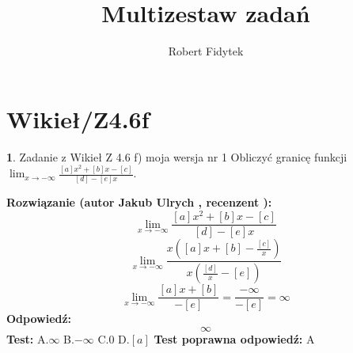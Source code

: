 \documentclass[12pt, a4paper]{article}
\title{Multizestaw zadań}
\author{Robert Fidytek}
\date{}
\theoremstyle{definition} %
\newtheorem{zad}{}
\newcommand{\kategoria}[1]{\section{#1}} %
\newcommand{\zadStart}[1]{\begin{zad}#1\newline} %
\newcommand{\zadStop}{\end{zad}}   %
\newcommand{\rozwStart}[2]{\noindent \textbf{Rozwiązanie (autor #1 , recenzent #2): }\newline} %
\newcommand{\rozwStop}{\newline}                                            %
\newcommand{\odpStart}{\noindent \textbf{Odpowiedź:}\newline}    %
\newcommand{\odpStop}{\newline}                                             %
\newcommand{\testStart}{\noindent \textbf{Test:}\newline} %
\newcommand{\testStop}{\newline} %
\newcommand{\kluczStart}{\noindent \textbf{Test poprawna odpowiedź:}\newline} %
\newcommand{\kluczStop}{\newline} %
\begin{document}
\maketitle


\kategoria{Wikieł/Z4.6f}
\zadStart{Zadanie z Wikieł Z 4.6 f) moja wersja nr 1}
Obliczyć granicę funkcji $\lim_{x \to -\infty}\frac{[a]x^{2}+[b]x-[c]}{[d]-[e]x}$.
\zadStop
\rozwStart{Jakub Ulrych}{}
$$\lim_{x \to -\infty}\frac{[a]x^{2}+[b]x-[c]}{[d]-[e]x}$$
$$\lim_{x \to -\infty}\frac{x([a]x+[b]-\frac{[c]}{x})}{x(\frac{[d]}{x}-[e])}$$
$$\lim_{x \to -\infty}\frac{[a]x+[b]}{-[e]}=\frac{-\infty}{-[e]}=\infty$$
\rozwStop
\odpStart
$$\infty$$
\odpStop
\testStart
A.$\infty$
B.$-\infty$
C.$0$
D.$[a]$
\testStop
\kluczStart
A
\kluczStop
\end{document}
